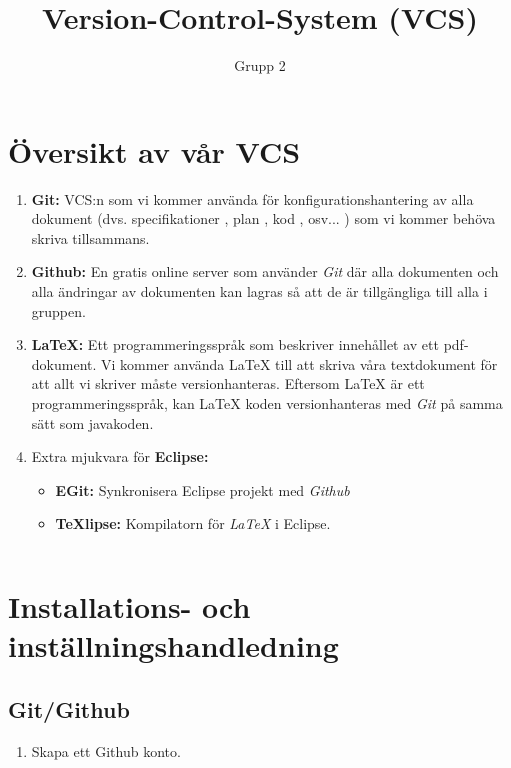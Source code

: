 \documentclass[11pt]{amsart}
\title{Version-Control-System (VCS)}
\author{Grupp 2}
\begin{document}
\maketitle
\lstset{language=Java}

\section*{\"{O}versikt av v\r{a}r VCS}

\begin{enumerate}

\item \textbf{Git:} VCS:n som vi kommer anv\"{a}nda f\"{o}r konfigurationshantering av alla dokument (dvs. specifikationer , plan , kod , osv... ) som vi kommer beh\"{o}va skriva tillsammans. \\

\item \textbf{Github:} En gratis online server som anv\"{a}nder \textit{Git} d\"{a}r alla dokumenten och alla \"{a}ndringar av dokumenten kan lagras s\r{a} att de \"{a}r tillg\"{a}ngliga till alla i gruppen. \\

\item \textbf{LaTeX:} Ett programmeringsspr\r{a}k som beskriver inneh\r{a}llet av ett pdf-dokument. Vi kommer anv\"{a}nda LaTeX till att skriva v\r{a}ra textdokument f\"{o}r att allt vi skriver m\r{a}ste versionhanteras. Eftersom LaTeX \"{a}r ett programmeringsspr\r{a}k, kan LaTeX koden versionhanteras med \textit{Git} p\r{a} samma s\"{a}tt som javakoden.\\

\item Extra mjukvara f\"{o}r \textbf{Eclipse:}  
	\begin{itemize}
	\item \textbf{EGit:} Synkronisera Eclipse projekt med \textit{Github}
	\item \textbf{TeXlipse:} Kompilatorn f\"{o}r \textit{LaTeX} i Eclipse. 
	\end{itemize}
	
\end{enumerate}
$$ $$


\section{Installations- och inst\"{a}llningshandledning}

\subsection{Git/Github}
\begin{enumerate}
\item Skapa ett Github konto. \\
\end{enumerate}
\end{document}
